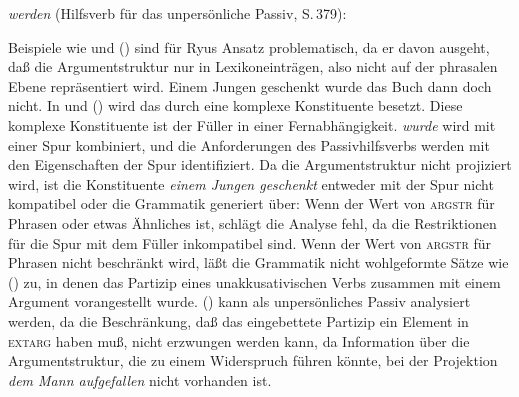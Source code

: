 {\eas
\emph{werden} (Hilfsverb für das unpersönliche Passiv, S.\,379):\\
\zs

\noindent
Beispiele wie  und () sind für
Ryus Ansatz problematisch, da er davon ausgeht, daß die Argumentstruktur
nur in Lexikoneinträgen, also nicht auf der phrasalen Ebene repräsentiert wird.
\ea
Einem Jungen    geschenkt wurde das Buch       dann doch      nicht.
\z
In  und () wird das \vf durch eine
komplexe Konstituente besetzt. Diese komplexe Konstituente ist der Füller in einer
Fernabhängigkeit. \emph{wurde} wird mit einer Spur kombiniert, und die Anforderungen
des Passivhilfsverbs werden mit den Eigenschaften der Spur identifiziert.
Da die Argumentstruktur nicht projiziert wird, ist die Konstituente
\emph{einem Jungen geschenkt} entweder mit der Spur nicht kompatibel
oder die Grammatik generiert über:
Wenn der Wert von \textsc{argstr} für Phrasen  oder etwas Ähnliches ist,
schlägt die Analyse fehl, da die Restriktionen für die Spur mit dem Füller inkompatibel sind.
Wenn der Wert von \textsc{argstr} für Phrasen nicht beschränkt wird, läßt
die Grammatik nicht wohlgeformte Sätze wie () zu, in denen das Partizip eines
unakkusativischen Verbs zusammen mit einem Argument vorangestellt wurde.
\z
() kann als unpersönliches Passiv analysiert werden, da die Beschränkung,
daß das eingebettete Partizip ein Element in \textsc{extarg} haben muß, nicht 
erzwungen werden kann, da Information über die Argumentstruktur, die zu einem Widerspruch führen
könnte, bei der Projektion \emph{dem Mann aufgefallen} nicht vorhanden ist.




}
